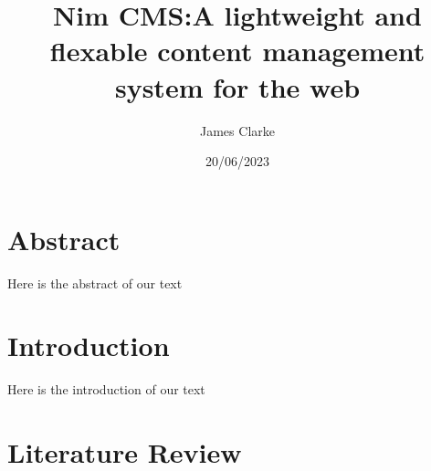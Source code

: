 \documentclass[12pt]{report}
\title{Nim CMS:\@ A lightweight and flexable content management system for the web}
\author{James Clarke}
\date{20/06/2023}
\begin{document}
\maketitle

\section{Abstract}

Here is the abstract of our text

\section{Introduction}

Here is the introduction of our text

\section{Literature Review}
\end{document}
